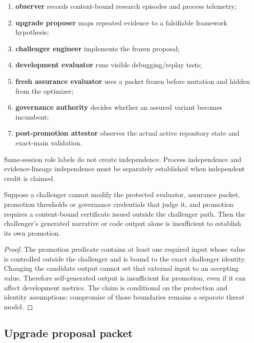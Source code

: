 \begin{enumerate}[leftmargin=*]
\item \textbf{observer} records content-bound research episodes and process telemetry;
\item \textbf{upgrade proposer} maps repeated evidence to a falsifiable framework hypothesis;
\item \textbf{challenger engineer} implements the frozen proposal;
\item \textbf{development evaluator} runs visible debugging/replay tests;
\item \textbf{fresh assurance evaluator} uses a packet frozen before mutation and hidden from the optimizer;
\item \textbf{governance authority} decides whether an assured variant becomes incumbent;
\item \textbf{post-promotion attestor} observes the actual active repository state and exact-main validation.
\end{enumerate}

Same-session role labels do not create independence. Process independence and evidence-lineage independence must be separately established when independent credit is claimed.

\begin{proposition}
Suppose a challenger cannot modify the protected evaluator, assurance packet, promotion thresholds or governance credentials that judge it, and promotion requires a content-bound certificate issued outside the challenger path. Then the challenger's generated narrative or code output alone is insufficient to establish its own promotion.
\end{proposition}

\begin{proof}
The promotion predicate contains at least one required input whose value is controlled outside the challenger and is bound to the exact challenger identity. Changing the candidate output cannot set that external input to an accepting value. Therefore self-generated output is insufficient for promotion, even if it can affect development metrics. The claim is conditional on the protection and identity assumptions; compromise of those boundaries remains a separate threat model.
\end{proof}

\subsection{Upgrade proposal packet}

